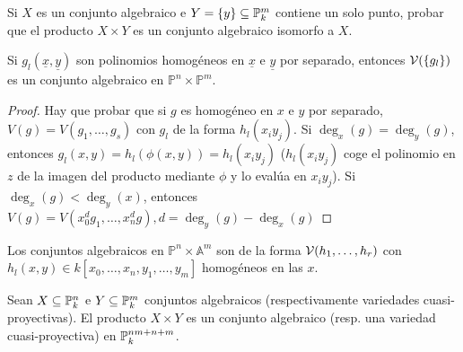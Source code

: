 \documentclass[ACGA.tex]{subfiles}
\begin{document}
\begin{ejer}\label{productoporpunto}
 Si $X$ es un conjunto algebraico e $Y=\{y\}\subseteq\mathbb{P}^m_k$ contiene un solo punto, probar que el producto $X\times Y$ es un conjunto algebraico isomorfo a $X$.
\end{ejer}

\begin{prop}
Si $g_l(\underline{x},\underline{y})$ son polinomios homogéneos en $\underline{x}$ e $\underline{y}$ por separado, entonces $\mathcal{V}(\{g_l\})$ es un conjunto algebraico en $\mathbb{P}^n\times\mathbb{P}^m$. 
\end{prop}
\begin{proof}
Hay que probar que si $g$ es homogéneo en $x$ e $y$ por separado, $V(g)=V(g_1,\dots,g_s)$ con $g_l$ de la forma $h_l(x_iy_j)$. Si $\deg_x(g)=\deg_y(g)$, entonces $g_l(x,y)=h_l(\phi(x,y))=h_l(x_iy_j)$ ($h_l(x_iy_j)$ coge el polinomio en $z$ de la imagen del producto mediante $\phi$ y lo evalúa en $x_iy_j$). Si $\deg_x(g)<\deg_y(x)$, entonces $V(g)=V(x_0^dg_1,\dots, x_n^dg), d=\deg_y(g)-\deg_x(g)$
\end{proof}

Los conjuntos algebraicos en $\mathbb{P}^n\times\mathbb{A}^m$ son de la forma $\mathcal{V}(h_1,\dots,h_r)$ con $h_l(x,y)\in k[x_0,\dots, x_n,y_1,\dots, y_m]$ homogéneos en las $x$. 



\begin{prop}\label{productoirreducible}
 Sean $X\subseteq\mathbb{P}^n_k$ e $Y\subseteq\mathbb{P}^m_k$ conjuntos algebraicos (respectivamente variedades cuasi-proyectivas). El producto $X\times Y$ es un conjunto algebraico (resp. una variedad cuasi-proyectiva) en $\mathbb{P}^{nm+n+m}_k$.
\end{prop}
\end{document}
